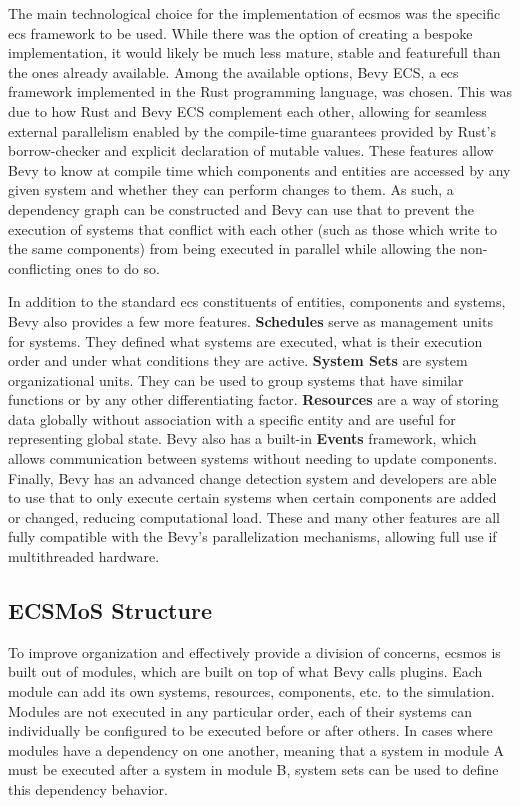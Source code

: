 \documentclass[twoside, 11pt]{article}
\begin{document}
The main technological choice for the implementation of \gls{ecsmos} was the specific \gls{ecs} framework to be used. While there was the option of creating a bespoke implementation, it would likely be much less mature, stable and featurefull than the ones already available. Among the available options, Bevy ECS, a \gls{ecs} framework implemented in the Rust programming language, was chosen. This was due to how Rust and Bevy ECS complement each other, allowing for seamless external parallelism enabled by the compile-time guarantees provided by Rust's borrow-checker and explicit declaration of mutable values. These features allow Bevy to know at compile time which components and entities are accessed by any given system and whether they can perform changes to them. As such, a dependency graph can be constructed and Bevy can use that to prevent the execution of systems that conflict with each other (such as those which write to the same components) from being executed in parallel while allowing the non-conflicting ones to do so.

In addition to the standard \gls{ecs} constituents of entities, components and systems, Bevy also provides a few more features. \textbf{Schedules} serve as management units for systems. They defined what systems are executed, what is their execution order and under what conditions they are active. \textbf{System Sets} are system organizational units. They can be used to group systems that have similar functions or by any other differentiating factor. \textbf{Resources} are a way of storing data globally without association with a specific entity and are useful for representing global state. Bevy also has a built-in \textbf{Events} framework, which allows communication between systems without needing to update components. Finally, Bevy has an advanced change detection system and developers are able to use that to only execute certain systems when certain components are added or changed, reducing computational load. These and many other features are all fully compatible with the Bevy's parallelization mechanisms, allowing full use if multithreaded hardware.

\subsection{ECSMoS Structure}

To improve organization and effectively provide a division of concerns, \gls{ecsmos} is built out of modules, which are built on top of what Bevy calls plugins. Each module can add its own systems, resources, components, etc. to the simulation. Modules are not executed in any particular order, each of their systems can individually be configured to be executed before or after others. In cases where modules have a dependency on one another, meaning that a system in module A must be executed after a system in module B, system sets can be used to define this dependency behavior.
\end{document}
